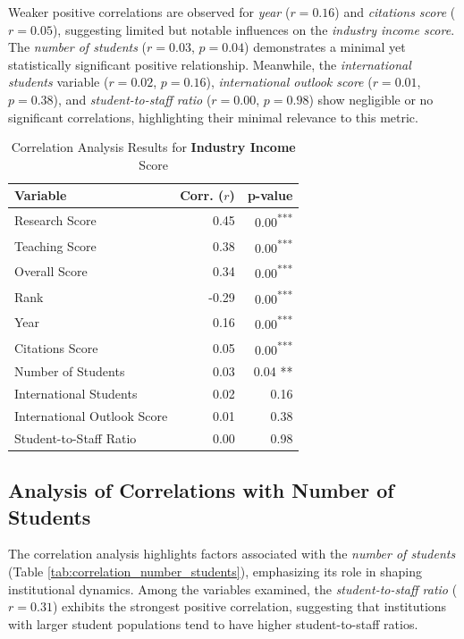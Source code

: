 \documentclass[sigconf]{acmart}
\begin{document}
Weaker positive correlations are observed for \textit{year} ($r = 0.16$) and \textit{citations score} ($r = 0.05$), suggesting limited but notable influences on the \textit{industry income score}. The \textit{number of students} ($r = 0.03$, $p = 0.04$) demonstrates a minimal yet statistically significant positive relationship. Meanwhile, the \textit{international students} variable ($r = 0.02$, $p = 0.16$), \textit{international outlook score} ($r = 0.01$, $p = 0.38$), and \textit{student-to-staff ratio} ($r = 0.00$, $p = 0.98$) show negligible or no significant correlations, highlighting their minimal relevance to this metric.

\begin{table}[h!]
	\centering
	\caption{Correlation Analysis Results for \textbf{Industry Income} Score}
	\label{tab:correlation_industry_income}
	\begin{tabular}{|l|r|r|}
		\hline
		\textbf{Variable} & \textbf{Corr. ($r$)} & \textbf{p-value} \\
		\hline
		Research Score & 0.45 & 0.00\textsuperscript{***} \\
		Teaching Score & 0.38 & 0.00\textsuperscript{***} \\
		Overall Score & 0.34 & 0.00\textsuperscript{***} \\
		Rank & -0.29 & 0.00\textsuperscript{***} \\
		Year & 0.16 & 0.00\textsuperscript{***} \\
		Citations Score & 0.05 & 0.00\textsuperscript{***} \\
		Number of Students & 0.03 & 0.04 ** \\
		International Students & 0.02 & 0.16 \\
		International Outlook Score & 0.01 & 0.38 \\
		Student-to-Staff Ratio & 0.00 & 0.98 \\
		\hline
	\end{tabular}
\end{table}


\subsection{Analysis of Correlations with Number of Students}

The correlation analysis highlights factors associated with the \textit{number of students} (Table \ref{tab:correlation_number_students}), emphasizing its role in shaping institutional dynamics. Among the variables examined, the \textit{student-to-staff ratio} ($r = 0.31$) exhibits the strongest positive correlation, suggesting that institutions with larger student populations tend to have higher student-to-staff ratios.
\end{document}
